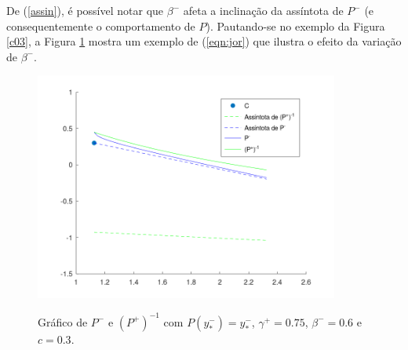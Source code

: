 De (\ref{assin}), é possível notar que $\beta^-$ afeta a inclinação da assíntota de $P^-$ (e consequentemente o comportamento de $P$). Pautando-se no exemplo da Figura \ref{c03}, a Figura \ref{beta1} mostra um exemplo de (\ref{eqn:jor}) que ilustra o efeito da variação de $\beta^-$. 
\begin{figure}[H]
\centering
\includegraphics[width=10cm]{poinc2}\\
\vspace{\baselineskip}
\caption{\label{beta1}Gráfico de $P^-$ e $(P^+)^{-1}$ com $P(y^-_*)=y^-_*$, $\gamma^+=0.75$, $\beta^-=0.6$ e $c=0.3$.}
\end{figure}

